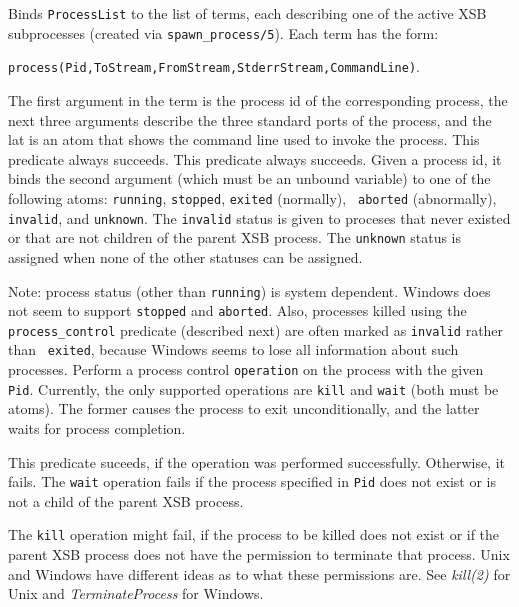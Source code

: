 \begin{description}
    Binds {\tt ProcessList} to the list of terms, each describing one of
    the active XSB subprocesses (created via \verb|spawn_process/5|).
    Each term has the form:
    \begin{center}
      \verb|process(Pid,ToStream,FromStream,StderrStream,CommandLine)|. 
    \end{center}
    The first argument in the term is the process id of the corresponding
    process, the next three arguments describe the three standard ports
    of the process, and the lat is an atom that shows the command line used
    to invoke the process.
    This predicate always succeeds.
    This predicate always succeeds. Given a process id, it binds the second
    argument (which must be an unbound variable) to one of the following
    atoms: {\tt running}, {\tt stopped}, {\tt exited} (normally), {\tt
      aborted} (abnormally), {\tt invalid}, and {\tt unknown}.
    The {\tt invalid} status is given to proceses that never existed or
    that are not children of the parent XSB process. The {\tt unknown}
    status is assigned when none of the other statuses can be assigned.

    Note: process status (other than {\tt running}) is system dependent.
    Windows does not seem to support {\tt stopped} and {\tt aborted}.
    Also, processes killed using the \verb|process_control| predicate
    (described next) are often marked as {\tt invalid} rather than {\tt
    exited}, because Windows seems to lose all information about such
    processes.
    Perform a process control {\tt operation} on the process with the given
    {\tt Pid}. 
    Currently, the only supported operations are {\tt kill} and {\tt wait}
    (both must be atoms).
    The former causes the process to exit unconditionally, and the latter
    waits for process completion.

    This predicate suceeds, if the operation was performed successfully.
    Otherwise, it fails. The {\tt wait} operation fails if the process
    specified in {\tt Pid} does not exist or is not a child of the parent
    XSB process. 
    
    The {\tt kill} operation might fail, if the process to be killed does
    not exist or if the parent XSB process does not have the permission to
    terminate that process. Unix and Windows have different ideas as to
    what these permissions are. See \emph{kill(2)} for Unix and
    \emph{TerminateProcess} for Windows.
    

\end{description}
